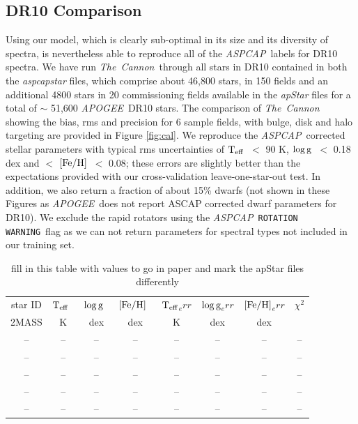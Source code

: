 \documentclass[12pt, preprint]{aastex}
\newcommand{\teff}{\mbox{$\rm T_{eff}$}}
\newcommand{\feh}{\mbox{$\rm [Fe/H]$}}
\newcommand{\logg}{\mbox{$\rm \log g$}}
\newcommand{\tc}{\textsl{The~Cannon}}
\newcommand{\apogee}{\textsl{APOGEE}}
\newcommand{\aspcap}{\textsl{ASPCAP}}
\newcommand{\rotwarn}{\texttt{ROTATION WARNING}}
\begin{document}
\subsection{DR10 Comparison}

Using our model, which is clearly sub-optimal in its size and its diversity of spectra, is nevertheless able to reproduce all of the \aspcap\ labels for DR10 spectra. We have run \tc\ through all stars in DR10 contained in both the \textit{aspcapstar} files,  which comprise about 46,800 stars, in 150 fields and an additional 4800 stars in 20 commissioning fields available in the \textit{apStar} files for a total of $\sim$ 51,600 \apogee\ DR10 stars. The comparison of \tc\, showing the bias, rms and precision for 6 sample fields, with bulge, disk and halo targeting are provided in Figure \ref{fig:cal}. We reproduce the \aspcap\ corrected stellar parameters with typical rms uncertainties of \teff\ $<$ 90 K, \logg\ $<$ 0.18 dex and $<$ \feh\ $<$ 0.08; these errors are slightly better than the expectations provided with our cross-validation leave-one-star-out test. In addition, we also return a fraction of about 15\% dwarfs (not shown in these Figures as \apogee\ does not report ASCAP corrected dwarf parameters for DR10). We exclude the rapid rotators using the \aspcap\ \rotwarn\ flag as we can not return parameters for spectral types not included in our training set. 

\begin{table}
\centering
\caption{Excerpt of table of measured stellar parameters from label transfer of \tc\. The full table of 42,000 stars is available online. We include DR10 commissioning fields for which no ASPCAP parameters were available and for these stars, marked with $^1$ we do not exclude on \textit{rotation warning flag set}. The full table is available as Supplementary Material online.}

\begin{tabular}{| c | c | c |  c | c | c |  c | c |}
\hline
star ID & \teff\ & \logg\ & \feh\ & \teff\mbox{$_err$} & \logg\mbox{$_err$} & \feh\mbox{$_err$} & $\chi^2$\\
{2MASS} &  K &  dex  & dex & K & dex & dex & \\    
\hline
-- &    -- &      -- &      -- &    -- &   -- &     -- & -- \\
-- &      -- &    -- &      -- &    -- &   -- &    -- & -- \\
-- &      --&     -- &    -- &    -- &     -- &     --&  -- \\
-- &    -- &      -- &    -- &    -- &   -- &    --&  -- \\
-- &     -- &    --&      -- &    -- &    --&      -- & -- \\
 \hline
\end{tabular}
\caption{fill in this table with values to go in paper and mark the apStar files differently} 
\label{tab:online}
\end{table}  
\end{document}
